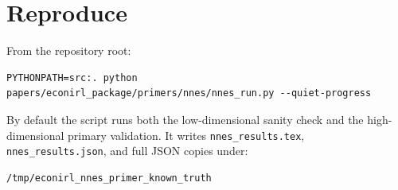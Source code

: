 \documentclass[10pt]{article}
\begin{document}
\section{Reproduce}

From the repository root:
\begin{verbatim}
PYTHONPATH=src:. python papers/econirl_package/primers/nnes/nnes_run.py --quiet-progress
\end{verbatim}

By default the script runs both the low-dimensional sanity check and the
high-dimensional primary validation. It writes \texttt{nnes\_results.tex},
\texttt{nnes\_results.json}, and full JSON copies under:
\begin{verbatim}
/tmp/econirl_nnes_primer_known_truth
\end{verbatim}



\end{document}
